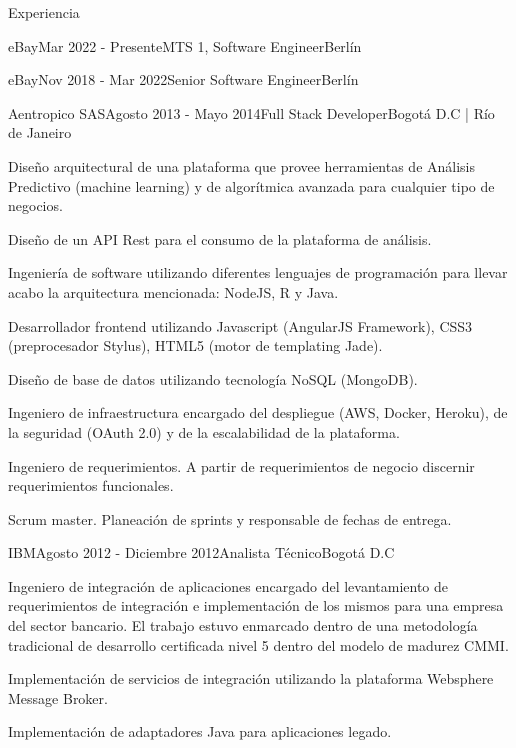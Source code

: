 \documentclass[spanish]{resume} %
\begin{document}
\begin{rSection}{Experiencia}
\begin{rSubsection}{eBay}{Mar 2022 - Presente}{MTS 1, Software Engineer}{Berl\'in}
\begin{rSubsection}{eBay}{Nov 2018 - Mar 2022}{Senior Software Engineer}{Berl\'in}
\begin{rSubsection}{Aentropico SAS}{Agosto 2013 - Mayo 2014}{Full Stack Developer}{Bogot\'a D.C | R\'io de Janeiro}
\item Dise\~no arquitectural de una plataforma que provee herramientas de An\'alisis Predictivo (machine learning) y de algor\'itmica avanzada para cualquier tipo de negocios.
\item Dise\~no de un API Rest para el consumo de la plataforma de an\'alisis.
\item Ingenier\'ia de software utilizando diferentes lenguajes de programaci\'on para llevar acabo la arquitectura mencionada: NodeJS, R y Java.
\item Desarrollador frontend utilizando Javascript (AngularJS Framework), CSS3 (preprocesador Stylus), HTML5 (motor de templating Jade).
\item Dise\~no de base de datos utilizando tecnolog\'ia NoSQL (MongoDB).
\item Ingeniero de infraestructura encargado del despliegue (AWS, Docker, Heroku), de la seguridad (OAuth 2.0) y de la escalabilidad de la plataforma.
\item Ingeniero de requerimientos. A partir de requerimientos de negocio discernir requerimientos funcionales.
\item Scrum master. Planeaci\'on de sprints y responsable de fechas de entrega.
\end{rSubsection}


\begin{rSubsection}{IBM}{Agosto 2012 - Diciembre 2012}{Analista T\'ecnico}{Bogot\'a D.C}
\item Ingeniero de integraci\'on de aplicaciones encargado del levantamiento de requerimientos de integraci\'on e implementaci\'on de los mismos para una empresa del sector bancario. El trabajo estuvo enmarcado dentro de una metodolog\'ia tradicional de desarrollo certificada nivel 5 dentro del modelo de madurez CMMI.
\item Implementaci\'on de servicios de integraci\'on utilizando la plataforma Websphere Message Broker.
\item Implementaci\'on de adaptadores Java para aplicaciones legado.
\end{rSubsection}



\end{rSubsection}
\end{rSubsection}
\end{rSection}
\end{document}
